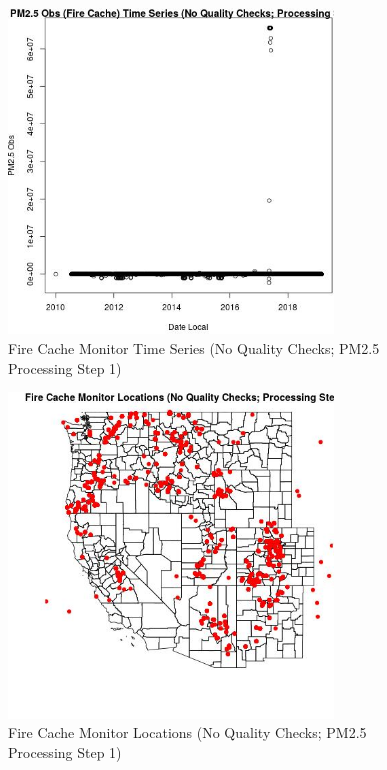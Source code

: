 
\begin{figure} 
\centering  
\includegraphics[width=0.77\textwidth]{Code_Outputs/PM25Source2TSstep1_PM25_ObsvDate_Local.jpg} 
\caption{\label{fig:PM25Source2TSstep1PM25_ObsvDate_Local}Fire Cache Monitor Time Series (No Quality Checks; PM2.5 Processing Step 1)} 
\end{figure} 
 

\begin{figure} 
\centering  
\includegraphics[width=0.77\textwidth]{Code_Outputs/PM25Source2TSstep1_MapFireCacheLocations.jpg} 
\caption{\label{fig:PM25Source2TSstep1MapFireCacheLocations}Fire Cache Monitor Locations (No Quality Checks; PM2.5 Processing Step 1)} 
\end{figure} 
 
